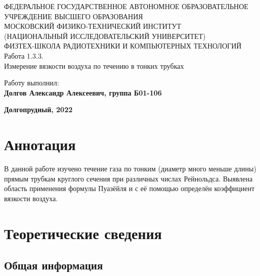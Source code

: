 \documentclass[15pt,a5paper,reqno]{article}
\begin{document}
\begin{center}
  {\small ФЕДЕРАЛЬНОЕ ГОСУДАРСТВЕННОЕ АВТОНОМНОЕ ОБРАЗОВАТЕЛЬНОЕ\\ УЧРЕЖДЕНИЕ ВЫСШЕГО ОБРАЗОВАНИЯ\\ МОСКОВСКИЙ ФИЗИКО-ТЕХНИЧЕСКИЙ ИНСТИТУТ\\ (НАЦИОНАЛЬНЫЙ ИССЛЕДОВАТЕЛЬСКИЙ УНИВЕРСИТЕТ)\\ ФИЗТЕХ-ШКОЛА РАДИОТЕХНИКИ И КОМПЬЮТЕРНЫХ ТЕХНОЛОГИЙ}\\
  \hfill \break
  \hfill \break
  \hfill \break
  \Huge{Работа 1.3.3. \\ Измерение вязкости воздуха по течению в тонких трубках}\\
\end{center}

\hfill \break
\hfill \break
\hfill \break
\hfill \break
\hfill \break
\hfill \break
\hfill \break
\hfill \break

\begin{flushright}
  \normalsize{Работу выполнил:}\\
  \normalsize{\textbf{Долгов Александр Алексеевич, группа Б01-106}}\\
\end{flushright}

\begin{center}
  \normalsize{\textbf{Долгопрудный, 2022}}
\end{center}


\thispagestyle{empty} %


\newpage
\thispagestyle{plain}
\tableofcontents
\thispagestyle{plain}
\newpage

\section{Аннотация}

    В данной работе изучено течение газа по тонким (диаметр много меньше длины) прямым трубкам круглого сечения при различных числах Рейнольдса. Выявлена область применения формулы Пуазёйля и с её помощью определён коэффициент вязкости воздуха.
	
\section{Теоретические сведения}

    \subsection{Общая информация}
\end{document}
